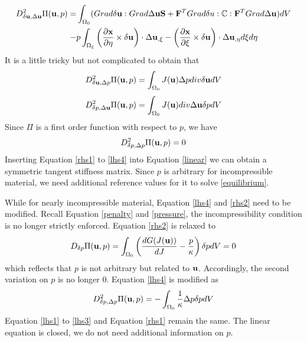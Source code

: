 \begin{equation} \label{lhs1}
\begin{split}
D_{\delta\bold{u}, \Delta\bold{u}}^2 \Pi(\bold{u}, p) = & \int_{\Omega_0}(Grad\delta\bold{u} : Grad\Delta\bold{u}\bold{S} + \bold{F}^TGrad\delta{u} : \mathbb{C} : \bold{F}^T Grad\Delta\bold{u})dV  \\
 - & p\int_{\Omega_{\xi}}  \left(\frac{\partial{\bold{x}}}{\partial{\eta}} \times \delta\bold{u}\right) \cdot\Delta{\bold{u}}_{,\xi} - 
\left(\frac{\partial{\bold{x}}}{\partial{\xi}} \times \delta\bold{u}\right) \cdot\Delta{\bold{u}}_{,\eta} d\xi{d\eta}
\end{split}
\end{equation}
It is a little tricky but not complicated to obtain that
\begin{equation} \label{lhs2}
D_{\delta\bold{u}, \Delta{p}}^2 \Pi(\bold{u}, p) = \int_{\Omega_0} J(\bold{u})\Delta{p}div\delta{\bold{u}}dV
\end{equation}
\begin{equation} \label{lhs3}
D_{\delta{p}, \Delta\bold{u}}^2 \Pi(\bold{u}, p) = \int_{\Omega_0} J(\bold{u})div\Delta{\bold{u}}\delta{p}dV
\end{equation}
Since $\Pi$ is a first order function with respect to $p$, we have
\begin{equation} \label{lhs4}
D_{\delta{p}, \Delta{p}}^2 \Pi(\bold{u}, p) = 0
\end{equation}
Inserting Equation \ref{rhs1} to \ref{lhs4} into Equation \ref{linear} we can obtain a symmetric tangent stiffness matrix. Since $p$ is arbitrary for incompressible material, we need additional reference values for it to solve \ref{equilibrium}.

While for nearly incompressible material, Equation \ref{lhs4} and \ref{rhs2} need to be modified. Recall Equation \ref{penalty} and \ref{pressure}, the incompressibility condition is no longer strictly enforced. Equation \ref{rhs2} is relaxed to
\begin{equation} \label{relation}
D_{\delta{p}}\Pi(\bold{u}, p) = \int_{\Omega_0}\left(  \frac{dG(J(\bold{u}))}{dJ} - \frac{p}{\kappa} \right)\delta{p}dV = 0
\end{equation}
which reflects that $p$ is not arbitrary but related to $\bold{u}$.  
Accordingly, the second variation on $p$ is no longer $0$. Equation \ref{lhs4} is modified as
\begin{equation} \label{lhs42}
D_{\delta{p}, \Delta{p}}^2 \Pi(\bold{u}, p) = - \int_{\Omega_0}\frac{1}{\kappa}\Delta{p}\delta{p}dV
\end{equation}
Equation \ref{lhs1} to \ref{lhs3} and Equation \ref{rhs1} remain the same. The linear equation is closed, we do not need additional information on $p$.

















